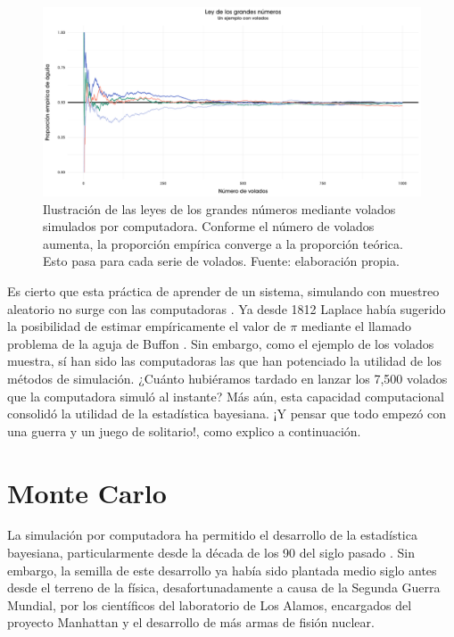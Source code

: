 \begin{figure}[h]
	\centering
	\includegraphics[scale=0.2]{Figs/Bayes/LGN}
	\caption{Ilustración de las leyes de los grandes números mediante volados simulados por computadora. Conforme el número de volados aumenta, la proporción empírica converge a la proporción teórica. Esto pasa para cada serie de volados. Fuente: elaboración propia.}
	\label{fig:LGN}	
\end{figure}

Es cierto que esta práctica de aprender de un sistema, simulando con muestreo aleatorio no surge con las computadoras \parencite{Owen13}. Ya desde 1812 Laplace había sugerido la posibilidad de estimar empíricamente el valor de $\pi$ mediante el llamado problema de la aguja de Buffon \parencite{Ragheb13}. Sin embargo, como el ejemplo de los volados muestra, sí han sido las computadoras las que han potenciado la utilidad de los métodos de simulación. ¿Cuánto hubiéramos tardado en lanzar los 7,500 volados que la computadora simuló al instante? Más aún, esta capacidad computacional consolidó la utilidad de la estadística bayesiana. ¡Y pensar que todo empezó con una guerra y un juego de solitario!, como explico a continuación.

\section{Monte Carlo} 

La simulación por computadora ha permitido el desarrollo de la estadística bayesiana, particularmente desde la década de los 90 del siglo pasado \parencite{RobertCasella11}. Sin embargo, la semilla de este desarrollo ya había sido plantada medio siglo antes desde el terreno de la física, desafortunadamente a causa de la Segunda Guerra Mundial, por los científicos del laboratorio de Los Alamos, encargados del proyecto Manhattan y el desarrollo de más armas de fisión nuclear.\\

